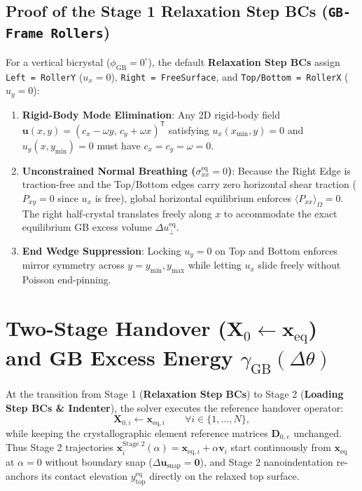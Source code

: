 \documentclass[11pt,a4paper]{article}
\newcommand{\T}{^{\mathsf T}}
\newcommand{\code}[1]{\texttt{#1}}
\begin{document}
\subsection{Proof of the Stage 1 Relaxation Step BCs (\code{GB-Frame Rollers})}
For a vertical bicrystal ($\phi_{\text{GB}} = 0^\circ$), the default \textbf{Relaxation Step BCs} assign \code{Left = RollerY} ($u_x=0$), \code{Right = FreeSurface}, and \code{Top/Bottom = RollerX} ($u_y=0$):
\begin{enumerate}
  \item \textbf{Rigid-Body Mode Elimination}: Any 2D rigid-body field $\mathbf{u}(x,y) = (c_x - \omega y,\, c_y + \omega x)\T$ satisfying $u_x(x_{\min}, y) = 0$ and $u_y(x, y_{\min}) = 0$ must have $c_x = c_y = \omega = 0$.
  \item \textbf{Unconstrained Normal Breathing ($\sigma_{xx}^{\text{eq}} = 0$)}: Because the Right Edge is traction-free and the Top/Bottom edges carry zero horizontal shear traction ($P_{xy}=0$ since $u_x$ is free), global horizontal equilibrium enforces $\langle P_{xx} \rangle_\Omega = 0$. The right half-crystal translates freely along $x$ to accommodate the exact equilibrium GB excess volume $\Delta u_\perp^{\text{eq}}$.
  \item \textbf{End Wedge Suppression}: Locking $u_y = 0$ on Top and Bottom enforces mirror symmetry across $y = y_{\min}, y_{\max}$ while letting $u_x$ slide freely without Poisson end-pinning.
\end{enumerate}

\section{Two-Stage Handover ($\mathbf{X}_0 \leftarrow \mathbf{x}_{\text{eq}}$) and GB Excess Energy $\gamma_{\text{GB}}(\Delta\theta)$}

At the transition from Stage 1 (\textbf{Relaxation Step BCs}) to Stage 2 (\textbf{Loading Step BCs \& Indenter}), the solver executes the reference handover operator:
\begin{equation}
  \mathbf{X}_{0,i} \longleftarrow \mathbf{x}_{\text{eq},i} \qquad \forall i \in \{1,\dots,N\},
\end{equation}
while keeping the crystallographic element reference matrices $\mathbf{D}_{0,e}$ unchanged. Thus Stage 2 trajectories $\mathbf{x}_i^{\text{Stage 2}}(\alpha) = \mathbf{x}_{\text{eq},i} + \alpha\mathbf{v}_i$ start continuously from $\mathbf{x}_{\text{eq}}$ at $\alpha = 0$ without boundary snap ($\Delta\mathbf{u}_{\text{snap}} = \mathbf{0}$), and Stage 2 nanoindentation re-anchors its contact elevation $y_{\text{top}}^{\text{eq}}$ directly on the relaxed top surface.
\end{document}
